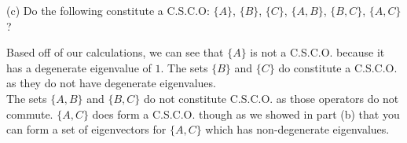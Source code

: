 \documentclass[a4paper, 11pt]{article}
\newenvironment{solution}{%
	\begin{list}{}{%
			\setlength{\topsep}{0pt}%
			\setlength{\leftmargin}{1.5cm}%
			\setlength{\rightmargin}{1.5cm}%
			\setlength{\listparindent}{\parindent}%
			\setlength{\itemindent}{\parindent}%
			\setlength{\parsep}{\parskip}%
		}%
		\item[]}{\end{list}}
\begin{document}
\noindent (c) Do the following constitute a C.S.C.O: $\{A\}$, $\{B\}$, $\{C\}$, $\{A, B\}$, $\{B, C\}$, $\{A,C\}$? \\
	\begin{solution}
		\noindent Based off of our calculations, we can see that $\{A\}$ is not a C.S.C.O. because it has a degenerate eigenvalue of $1$. The sets $\{B\}$ and $\{C\}$ do constitute a C.S.C.O. as they do not have degenerate eigenvalues. \\ 
		
		\noindent The sets $\{A,B\}$ and $\{B,C\}$ do not constitute C.S.C.O. as those operators do not commute. $\{A,C\}$ does form a C.S.C.O. though as we showed in part (b) that you can form a set of eigenvectors for $\{A,C\}$ which has non-degenerate eigenvalues. 
	\end{solution}
\end{document}
